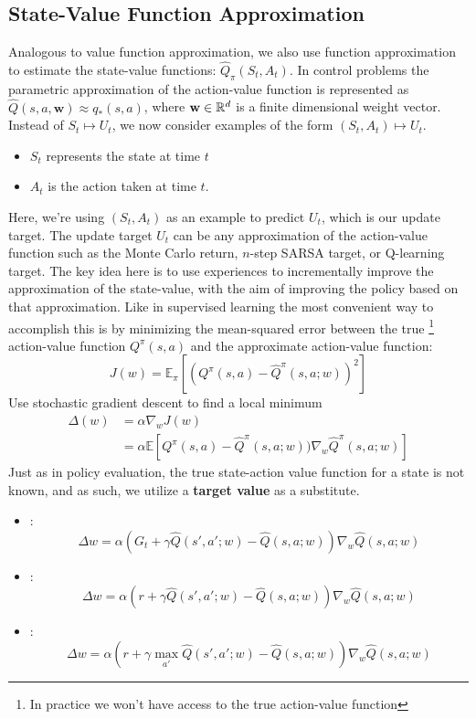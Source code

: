 \subsection{State-Value Function Approximation}
Analogous to value function approximation, we also use function approximation to estimate the state-value functions: $\hat{Q}_{\pi} (S_t, A_t)$. 
In control problems the parametric approximation of the action-value function is represented as $\hat{Q}(s,a,\mathbf{w} ) \approx q_{*}(s,a)$, where $\mathbf{w}  \in \mathbb R^d$ is a finite dimensional weight vector. Instead of $S_t \mapsto U_t$, 
we now consider examples of the form $(S_t, A_t) \mapsto U_t$. 
\begin{itemize}
    \item $S_t$ represents the state at time $t$
    \item  $A_t$ is the action taken at time $t$.
\end{itemize}
Here, we're using $(S_t, A_t)$ as an example to predict $U_t$, which is our update target.
The update target $U_t$ can be any approximation of the action-value function such as the Monte Carlo return, $n$-step SARSA target, or Q-learning target. The key idea here is to use experiences to incrementally improve the approximation of the state-value, with the aim of improving the policy based on that approximation. Like in supervised learning the most convenient way to accomplish this is by minimizing the mean-squared error between the true \footnote{In practice we won't have access to the true action-value function}
action-value function $Q^\pi(s, a)$ and the approximate action-value function: 
$$
J(w) = \mathbb{E}_\pi[(Q^\pi(s, a) - \hat{Q}^\pi(s, a; w))^2]
$$
Use stochastic gradient descent to find a local minimum
\begin{align*}
\Delta(w) &= \alpha \nabla_w J(w) \\
&= \alpha \mathbb{E}[Q^\pi(s, a)  - \hat{Q}^\pi(s, a; w))\nabla_w \hat{Q}^\pi(s, a; w)]
\end{align*}
Just as in policy evaluation, the true state-action value function for a state is not known, and as such, we utilize a \textbf{target value} as a substitute.
\begin{itemize}
    \item {}: 
    $$
    \Delta w = \alpha \left(G_t + \gamma \hat{Q}(s', a'; w) - \hat{Q}(s, a; w)\right) \nabla_w \hat{Q}(s, a; w)
    $$
    \item {}:
    $$
    \Delta w = \alpha \left(r + \gamma \hat{Q}(s', a'; w) - \hat{Q}(s, a; w)\right) \nabla_w \hat{Q}(s, a; w) 
    $$
    \item {}:
    $$
    \Delta w = \alpha \left(r + \gamma \max_{a'} \hat{Q}(s', a'; w) - \hat{Q}(s, a; w)\right) \nabla_w \hat{Q}(s, a; w)
    $$
\end{itemize}
